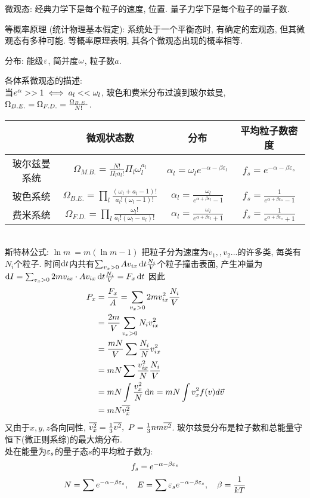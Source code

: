 \documentclass[UTF8,9pt]{ctexart}
\newcommand{\q}[1]{{\color{red} #1}}
\begin{document}
微观态: 经典力学下是每个粒子的速度, 位置. 量子力学下是每个粒子的量子数.

\q{等概率原理 (统计物理基本假定)}: 系统处于一个平衡态时, 有确定的宏观态, 但其微观态有多种可能. 等概率原理表明, 其各个微观态出现的概率相等.

分布: 能级$\varepsilon$, 简并度$\omega$, 粒子数$a$.

各体系微观态的描述: \\
当$e^\alpha>>1 \iff a_l<<\omega_l$, 玻色和费米分布过渡到玻尔兹曼, $\Omega_{B.E.}=\Omega_{F.D.}=\frac{\Omega_{B.E.}}{N!}$.
\begin{table}[htbp]
	\centering
	\begin{tabular}{|c|c|c|c|}
		\hline
		             & 微观状态数                                                                                                & 分布                                                               & 平均粒子数密度                                         \\ \hline
		玻尔兹曼系统 & $\Omega_{M . B .}=\frac{N !}{\Pi_{l} a_{l} !} \Pi_{l} \omega_{l}^{a_{l}}$                                 & $\alpha_{l}=\omega_{l} e^{-\alpha-\beta \varepsilon_{l}}$          & $f_{s}=e^{-\alpha-\beta \varepsilon_{s}}$              \\ \hline
		玻色系统     & $\Omega_{B . E .}=\prod_{l} \frac{\left(\omega_{l}+a_{l}-1\right) !}{a_{l} !\left(\omega_{l}-1\right) !}$ & $\alpha_{l}=\frac{\omega_{l}}{e^{\alpha+\beta \varepsilon_{l}}-1}$ & $f_{s}=\frac{1}{e^{\alpha+\beta \varepsilon_{s}} - 1}$ \\ \hline
		费米系统     & $\Omega_{F . D .}=\prod_{l} \frac{\omega_{l} !}{a_l!\left(\omega_{l}-a_{l}\right) !}$                     & $\alpha_{l}=\frac{\omega_{l}}{e^{\alpha+\beta \varepsilon_{l}}+1}$ & $f_{s}=\frac{1}{e^{\alpha+\beta \varepsilon_{s}} + 1}$ \\ \hline
	\end{tabular}
\end{table}\\
\q{斯特林公式}: $\ln m~ =m(\ln m-1)$
把粒子分为速度为$v_1,,v_2...$的许多类, 每类有$N_i$个粒子. 时间$\mathop{}\!\mathrm{d} t$内共有$\sum_{v_x>0} Av_{ix}\mathop{}\!\mathrm{d} t\frac{N_i}{V}$个粒子撞击表面, 产生冲量为$\mathop{}\!\mathrm{d} I=\sum_{v_x>0} 2mv_{ix} \cdot Av_{ix}\mathop{}\!\mathrm{d} t\frac{N_i}{V}=F_x\mathop{}\!\mathrm{d} t$
因此
$$\begin{aligned} 
	P_x&= \frac{F_x}{A}=\sum_{v_x>0} 2mv_{ix}^2\frac{N_i}{V}\\
	&= \frac{2m}{V}\sum_{v_x>0} N_iv_{ix}^2\\
	&= \frac{mN}{V}\sum \frac{N_i}{N}v_{ix}^2\\
	&=  mN\sum \frac{v_{ix}^2}{N}\frac{N_i}{V}\\
	&= mN\int \frac{v_x^2}{N}\mathop{}\!\mathrm{d} n=mN\int v_x^2f(v)d\vec{v}\\
	&= mN\overline{v_x^2}
	 \end{aligned}$$
又由于$x,y,z$各向同性, $\bar{v_x^2}=\ff{3}\bar{v^2},\ P=\ff{3}nm\bar{v^2}$.
玻尔兹曼分布是粒子数和总能量守恒下(微正则系综)的最大熵分布.\\
处在能量为$\varepsilon_s$的量子态$s$的平均粒子数为:
$$f_s=e^{-\alpha-\beta\varepsilon_s}$$
$$N=\sum e^{-\alpha-\beta\varepsilon_s}, \quad E=\sum \varepsilon_s e^{-\alpha-\beta\varepsilon_s}, \quad \beta=\frac{1}{kT}$$
\end{document}
